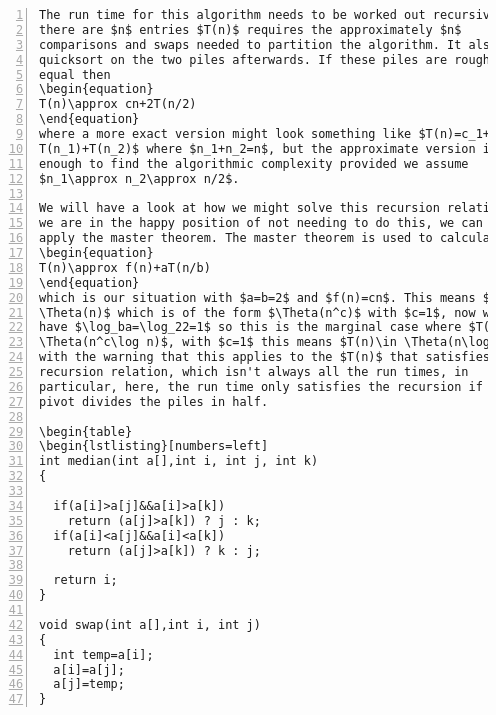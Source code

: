 \documentclass[11pt,a4paper]{scrartcl}
\begin{document}
\begin{table}
\begin{lstlisting}[numbers=left]
The run time for this algorithm needs to be worked out recursively. If
there are $n$ entries $T(n)$ requires the approximately $n$
comparisons and swaps needed to partition the algorithm. It also calls
quicksort on the two piles afterwards. If these piles are roughly
equal then
\begin{equation}
T(n)\approx cn+2T(n/2)
\end{equation}
where a more exact version might look something like $T(n)=c_1+c_2n +
T(n_1)+T(n_2)$ where $n_1+n_2=n$, but the approximate version is good
enough to find the algorithmic complexity provided we assume
$n_1\approx n_2\approx n/2$. 

We will have a look at how we might solve this recursion relation, but
we are in the happy position of not needing to do this, we can just
apply the master theorem. The master theorem is used to calculate the algorithmic behavior of solutions to the recursion
\begin{equation}
T(n)\approx f(n)+aT(n/b)
\end{equation}
which is our situation with $a=b=2$ and $f(n)=cn$. This means $f(n)\in
\Theta(n)$ which is of the form $\Theta(n^c)$ with $c=1$, now we also
have $\log_ba=\log_22=1$ so this is the marginal case where $T(n)\in
\Theta(n^c\log n)$, with $c=1$ this means $T(n)\in \Theta(n\log n)$,
with the warning that this applies to the $T(n)$ that satisfies the
recursion relation, which isn't always all the run times, in
particular, here, the run time only satisfies the recursion if the
pivot divides the piles in half.

\begin{table}
\begin{lstlisting}[numbers=left]
int median(int a[],int i, int j, int k)
{

  if(a[i]>a[j]&&a[i]>a[k])
    return (a[j]>a[k]) ? j : k;
  if(a[i]<a[j]&&a[i]<a[k])
    return (a[j]>a[k]) ? k : j;

  return i;
}

void swap(int a[],int i, int j)
{
  int temp=a[i];
  a[i]=a[j];
  a[j]=temp;
}
\end{lstlisting}
\caption{Some functions for quicksort. These are two functions needed
  for quicksort, it has been split into two parts to help it fit
  nicer, the other part contains the actual algorithm, this part
  contains two of the functions it needs, the swap basically swaps the
  values at a[i] and a[j] and, if you unpack all the ternary
  operators, median returns i, j or k depending on which of a[i], a[j]
  and a[k] has the value in the middle when they are put in
  order.\label{c_quick_extras}}
\end{table}
\end{document}
